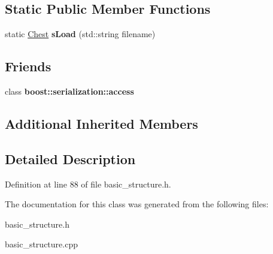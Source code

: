 \subsection*{Static Public Member Functions}
\begin{DoxyCompactItemize}
\item 
\hypertarget{class_chest_a577f83d173be0331b92093dcfb2cf4ca}{}\label{class_chest_a577f83d173be0331b92093dcfb2cf4ca} 
static \hyperlink{class_chest}{Chest} {\bfseries s\+Load} (std\+::string filename)
\end{DoxyCompactItemize}
\subsection*{Friends}
\begin{DoxyCompactItemize}
\item 
\hypertarget{class_chest_ac98d07dd8f7b70e16ccb9a01abf56b9c}{}\label{class_chest_ac98d07dd8f7b70e16ccb9a01abf56b9c} 
class {\bfseries boost\+::serialization\+::access}
\end{DoxyCompactItemize}
\subsection*{Additional Inherited Members}


\subsection{Detailed Description}


Definition at line 88 of file basic\+\_\+structure.\+h.



The documentation for this class was generated from the following files\+:\begin{DoxyCompactItemize}
\item 
basic\+\_\+structure.\+h\item 
basic\+\_\+structure.\+cpp\end{DoxyCompactItemize}

